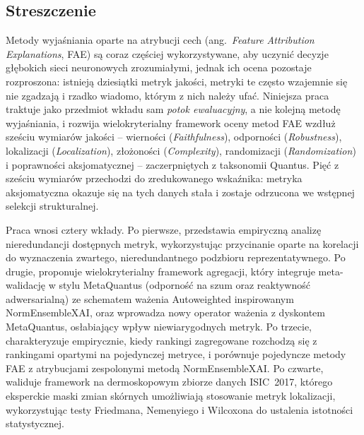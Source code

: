 \documentclass[en,11pt]{aghdpl}  %
\begin{document}
\begin{otherlanguage}{polish}
\chapter*{Streszczenie}

Metody wyjaśniania oparte na atrybucji cech (ang.\ \emph{Feature Attribution
Explanations}, FAE) są coraz częściej wykorzystywane, aby uczynić decyzje
głębokich sieci neuronowych zrozumiałymi, jednak ich ocena pozostaje
rozproszona: istnieją dziesiątki metryk jakości, metryki te często wzajemnie
się nie zgadzają i rzadko wiadomo, którym z nich należy ufać. Niniejsza praca
traktuje jako przedmiot wkładu sam \emph{potok ewaluacyjny}, a nie kolejną
metodę wyjaśniania, i rozwija wielokryterialny framework oceny metod FAE
wzdłuż sześciu wymiarów jakości -- wierności (\emph{Faithfulness}), odporności
(\emph{Robustness}), lokalizacji (\emph{Localization}), złożoności
(\emph{Complexity}), randomizacji (\emph{Randomization}) i poprawności
aksjomatycznej -- zaczerpniętych z taksonomii Quantus. Pięć z sześciu
wymiarów przechodzi do zredukowanego wskaźnika: metryka aksjomatyczna
okazuje się na tych danych stała i zostaje odrzucona we wstępnej selekcji
strukturalnej.

Praca wnosi cztery wkłady. Po pierwsze, przedstawia empiryczną analizę
nieredundancji dostępnych metryk, wykorzystując przycinanie oparte na
korelacji do wyznaczenia zwartego, nieredundantnego podzbioru
reprezentatywnego. Po drugie, proponuje wielokryterialny framework agregacji,
który integruje meta-walidację w stylu MetaQuantus (odporność na szum oraz
reaktywność adwersarialną) ze schematem ważenia Autoweighted inspirowanym
NormEnsembleXAI, oraz wprowadza nowy operator ważenia z dyskontem
MetaQuantus, osłabiający wpływ niewiarygodnych metryk. Po trzecie,
charakteryzuje empirycznie, kiedy rankingi zagregowane rozchodzą się z
rankingami opartymi na pojedynczej metryce, i porównuje pojedyncze metody FAE
z atrybucjami zespolonymi metodą NormEnsembleXAI. Po czwarte, waliduje
framework na dermoskopowym zbiorze danych ISIC~2017, którego eksperckie maski
zmian skórnych umożliwiają stosowanie metryk lokalizacji, wykorzystując testy
Friedmana, Nemenyiego i Wilcoxona do ustalenia istotności statystycznej.


\end{otherlanguage}
\end{document}

